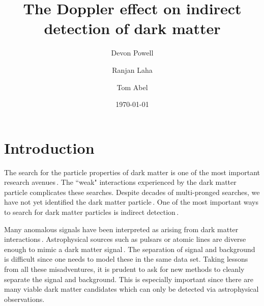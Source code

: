 \documentclass[aps,prd,10pt,twocolumn,superscriptaddress,showpacs]{revtex4-1}
\begin{document}
\title{The Doppler effect on indirect detection of dark matter}
\author{Devon Powell}
\author{Ranjan Laha}
\author{Tom Abel}
\date{\today}

\begin{abstract}
\cite{speckhard2016}
\end{abstract}


\maketitle


\section{Introduction}
\label{sec:Introduction}

The search for the particle properties of dark matter is one of the most important research avenues\,\cite{Jungman:1995df,Bertone:2004pz,Strigari:2013iaa}.  The ``weak" interactions experienced by the dark matter particle complicates these searches.  Despite decades of multi-pronged searches, we have not yet identified the dark matter particle\,\cite{Bertone:2016nfn}.  One of the most important ways to search for dark matter particles is indirect detection\,\cite{Klasen:2015uma}.

Many anomalous signals have been interpreted as arising from dark matter interactions\,\cite{Loewenstein:2009cm,Prokhorov:2010us,Weniger:2012tx,Abazajian:2014hsa,Lee:2015fea,Bartels:2015aea,Bulbul:2014sua,Boyarsky:2014jta,Urban:2014yda}.  Astrophysical sources such as pulsars or atomic lines are diverse enough to mimic a dark matter signal\,\cite{O'Leary:2015gfa,Brandt:2015ula,O'Leary:2016osi,Gu:2015gqm,Phillips:2015wla,Shah:2016efh}.  The separation of signal and background is difficult since one needs to model these in the same data set.  Taking lessons from all these misadventures, it is prudent to ask for new methods to cleanly separate the signal and background.  This is especially important since there are many viable dark matter candidates which can only be detected via astrophysical observations.  
\end{document}
